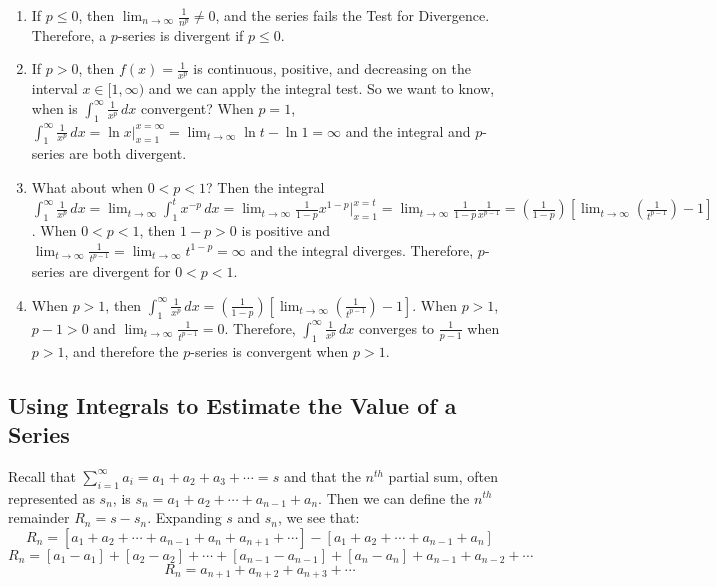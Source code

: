 \begin{Answer}[ref = pseries]
\begin{enumerate}
\item If $p \leq 0$, then $\lim_{n \to \infty} \frac{1}{n^p} \neq 0$, and the 
series fails the Test for Divergence. Therefore, a $p$-series is divergent if 
$p \leq 0$. 
\item If $p > 0$, then $f(x) = \frac{1}{x^p}$ is continuous, positive, and 
decreasing on the interval $x \in [1, \infty)$ and we can apply the integral 
test. So we want to know, when is $\int_1^\infty \frac{1}{x^p}\,dx$ convergent? 
When $p=1$, $\int_1^\infty \frac{1}{x^p}\,dx = \ln{x}|_{x=1}^{x=\infty} = \lim_
{t \to \infty} \ln{t} - \ln{1} = \infty$ and the integral and $p$-series are 
both divergent.
\item What about when $0 < p < 1$? Then the integral $\int_1^\infty \frac{1}{
x^p}\,dx = \lim_{t \to \infty} \int_1^t x^{-p}\,dx = \lim_{t \to \infty} 
\frac{1}{1-p}x^{1-p}|_{x=1}^{x=t} = \lim_{t \to \infty} \frac{1}{1-p}\frac{1}{
x^{p-1}} = \left( \frac{1}{1-p} \right) \left[\lim_{t \to \infty} \left( \frac{
1}{t^{p-1}} \right) - 1 \right]$. When $0 < p < 1$, then $1 - p > 0$ is 
positive and $\lim_{t \to \infty} \frac{1}{t^{p-1}} = \lim_{t \to \infty} t^{1-
p} = \infty$ and the integral diverges. Therefore, $p$-series are divergent for 
$0 < p < 1$.
\item When $p > 1$, then $\int_1^\infty \frac{1}{x^p}\,dx = \left( \frac{1}{1-
p} \right) \left[\lim_{t \to \infty} \left( \frac{1}{t^{p-1}} \right) - 1 
\right]$. When $p > 1$, $p - 1 > 0$ and $\lim_{t \to \infty} \frac{1}{t^{p-1}} 
= 0$. Therefore, $\int_{1}^\infty \frac{1}{x^p}\,dx$ converges to $\frac{1}{p 
- 1}$ when $p > 1$, and therefore the $p$-series is convergent when $p > 1$. 
\end{enumerate}
\end{Answer}

\subsection{Using Integrals to Estimate the Value of a Series}
Recall that $\sum_{i=1}^\infty a_i = a_1 + a_2 + a_3 + \cdots = s$ and that 
the $n^{th}$ partial sum, often represented as $s_n$, is $s_n = a_1 + a_2 + 
\cdots + a_{n-1} + a_n$. Then we can define the $n^{th}$ remainder $R_n = s - 
s_n$. Expanding $s$ and $s_n$, we see that:
$$R_n = \left[ a_1 + a_2 + \cdots + a_{n-1} + a_n + a_{n+1} + \cdots \right] - 
\left[ a_1 + a_2 + \cdots + a_{n-1} + a_{n} \right]$$
$$R_n = [a_1 - a_1] + [a_2 - a_2] + \cdots + [a_{n-1} - a_{n-1}] + [a_n - a_n] 
+ a_{n-1} + a_{n-2} + \cdots$$
$$R_n = a_{n+1} + a_{n+2} + a_{n+3} + \cdots$$

